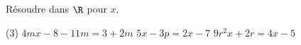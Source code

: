 \documentclass[a4paper,12pt]{report}
\begin{document}
\begin{boiteExT}
	\vspace{8cm}

\end{boiteExT}


\begin{boiteExT}
	\vspace{6cm}

\end{boiteExT}

\begin{boiteExT}[Exemple 1 $(k+2)x=8$]
	\vspace{6cm}

\end{boiteExT}


\begin{boiteExT}[Exemple 2 $a(x-3)=5a$]
	\vspace{6cm}

\end{boiteExT}

\begin{boiteExT}[Exemple 3 $(p-1)x+3=3x$] 
	\vspace{6cm}

\end{boiteExT}

\begin{boiteExT}[Exemple 4 $(m+3)x+7=mx+10$]
	\vspace{6cm}

\end{boiteExT}
\begin{exo}
Résoudre dans $\R$ pour $x$.
\begin{tasks}(3)
	\task $4 m x-8-11 m=3+2 m$
	\task $5x-3p=2x-7$
	\task $9r^2x+2r=4x-5$
\end{tasks}
\end{exo}
\end{document}
